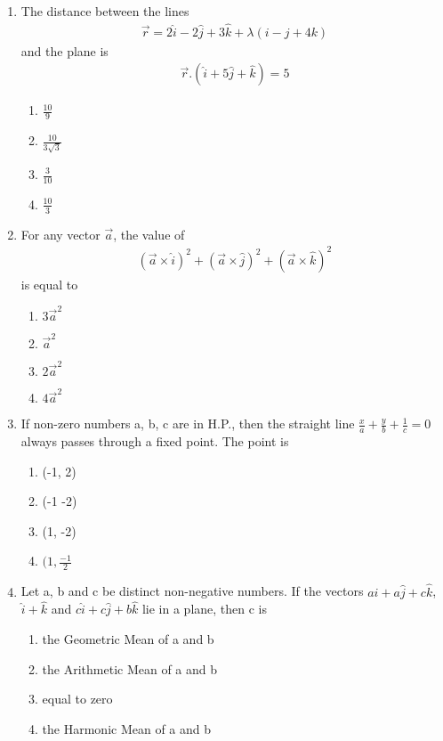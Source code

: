 \begin{enumerate}[label=\arabic*.,ref=\thesubsection.\theenumi]
\item The distance between the lines
\begin{align*}
\overrightarrow{r} = 2\hat{i} - 2\hat{j} + 3\hat{k} + \lambda(i - j + 4k)
\end{align*}
and the plane is 
\begin{align*}
\overrightarrow{r}.(\hat{i} + 5\hat{j} + \hat{k}) = 5
\end{align*}
\begin{enumerate}
\item $\frac{10}{9}$
\item $\frac{10}{3\sqrt{3}}$
\item $\frac{3}{10}$
\item $\frac{10}{3}$
\end{enumerate}

\item For any vector $\overrightarrow{a}$, the value of 
\begin{align*}
(\overrightarrow{a} \times \hat{i})^{2} + (\overrightarrow{a} \times \hat{j})^{2} + (\overrightarrow{a} \times \hat{k})^{2}
\end{align*}
is equal to
\begin{enumerate}
\item $3\overrightarrow{a}^{2}$
\item $\overrightarrow{a}^{2}$
\item $2\overrightarrow{a}^{2}$
\item $4\overrightarrow{a}^{2}$
\end{enumerate}

\item If non-zero numbers a, b, c are in H.P., then the straight line $\frac{x}{a} + \frac{y}{b} + \frac{1}{c} = 0$ always passes through a fixed point. The point is
\begin{enumerate}
\item (-1, 2)
\item (-1 -2)
\item (1, -2)
\item $(1, \frac{-1}{2}$
\end{enumerate}

\item Let a, b and c be distinct non-negative numbers. If the vectors $a\hat{i} + a\hat{j} + c\hat{k}$, $\hat{i} + \hat{k}$ and $c\hat{i} + c\hat{j} + b\hat{k}$ lie in a plane, then c is
\begin{enumerate}
\item the Geometric Mean of a and b
\item the Arithmetic Mean of a and b
\item equal to zero
\item the Harmonic Mean of a and b
\end{enumerate}


\end{enumerate}
